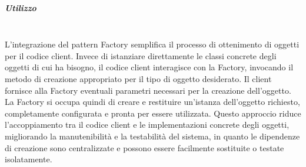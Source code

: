 \documentclass[10pt]{article}
\newcommand{\mysubparagraph}[1]{\subparagraph{#1}\mbox{}\\}
\begin{document}
    \mysubparagraph{Utilizzo}
    L'integrazione del pattern Factory semplifica il processo di ottenimento di oggetti per il codice client. Invece di istanziare direttamente le classi concrete degli oggetti di cui ha bisogno, il codice client interagisce con la Factory, invocando il metodo di creazione appropriato per il tipo di oggetto desiderato. Il client fornisce alla Factory eventuali parametri necessari per la creazione dell'oggetto. La Factory si occupa quindi di creare e restituire un'istanza dell'oggetto richiesto, completamente configurata e pronta per essere utilizzata. Questo approccio riduce l'accoppiamento tra il codice client e le implementazioni concrete degli oggetti, migliorando la manutenibilità e la testabilità del sistema, in quanto le dipendenze di creazione sono centralizzate e possono essere facilmente sostituite o testate isolatamente.
\end{document}
